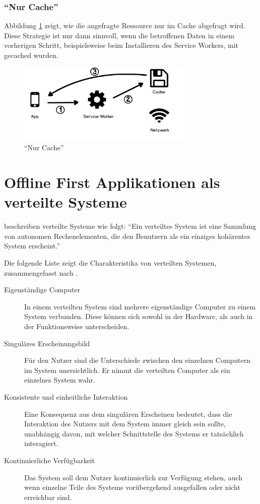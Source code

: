 \documentclass[a4paper, 12pt]{scrreprt}
\begin{document}
\subsubsection{\enquote{Nur Cache}}
Abbildung \ref{fig:cachingCacheOnly} zeigt, wie die angefragte Ressource nur im Cache abgefragt wird. Diese Strategie ist nur dann sinnvoll, wenn die betroffenen Daten in einem vorherigen Schritt, beispielsweise beim Installieren des Service Workers, mit gecached wurden.

\begin{figure}[h]
	\centering
	\includegraphics[width=0.75\textwidth]{cacheonly.png}
	\caption{\enquote{Nur Cache}}
	\label{fig:cachingCacheOnly}
\end{figure}

\section{Offline First Applikationen als verteilte Systeme}\label{sec:OfflineFirstVerteiteSysteme}
\citet{ArticleDistributedSystems} beschreiben verteilte Systeme wie folgt: \enquote{Ein verteiltes System ist eine Sammlung von autonomen Rechenelementen, die den Benutzern als ein einziges kohärentes System erscheint.}

Die folgende Liste zeigt die Charakteristika von verteilten Systemen, zusammengefasst nach \citet{BookDistributedSystemsDefinition}.

\begin{description}
\item[Eigenständige Computer] In einem verteilten System sind mehrere eigenständige Computer zu einem System verbunden. Diese können sich sowohl in der Hardware, als auch in der Funktionsweise unterscheiden. 
\item[Singuläres Erscheinungsbild] Für den Nutzer sind die Unterschiede zwischen den einzelnen Computern im System unersichtlich. Er nimmt die verteilten Computer als ein einzelnes System wahr. 
\item[Konsistente und einheitliche Interaktion]
	Eine Konsequenz aus dem singulären Erscheinen bedeutet, dass die Interaktion des Nutzers mit dem System immer gleich sein sollte, unabhängig davon, mit welcher Schnittstelle des Systems er tatsächlich interagiert. 
\item[Kontinuierliche Verfügbarkeit]
	Das System soll dem Nutzer kontinuierlich zur Verfügung stehen, auch wenn einzelne Teile des Systems vorübergehend ausgefallen oder nicht erreichbar sind.
\end{description}
\label{tab:charakteristikaDistributedSystem}
\end{document}
